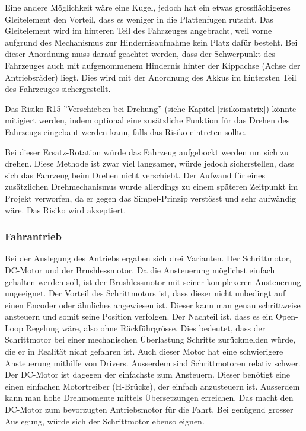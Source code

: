 \documentclass[../main.tex]{subfiles}
\begin{document}
Eine andere Möglichkeit wäre eine Kugel, jedoch hat ein etwas grossflächigeres Gleitelement den Vorteil, dass es weniger in die Plattenfugen rutscht. Das Gleitelement wird im hinteren Teil des Fahrzeuges angebracht, weil vorne aufgrund des Mechanismus zur Hindernisaufnahme kein Platz dafür besteht. Bei dieser Anordnung muss darauf geachtet werden, dass der Schwerpunkt des Fahrzeuges auch mit aufgenommenem Hindernis hinter der Kippachse (Achse der Antriebsräder) liegt. Dies wird mit der Anordnung des Akkus im hintersten Teil des Fahrzeuges sichergestellt.

Das Risiko R15 ''Verschieben bei Drehung'' (siehe Kapitel \ref{risikomatrix}) könnte mitigiert werden,
indem optional eine zusätzliche Funktion für das Drehen des Fahrzeugs eingebaut werden kann, falls das Risiko eintreten sollte.

Bei dieser Ersatz-Rotation würde das Fahrzeug aufgebockt werden um sich zu drehen.
Diese Methode ist zwar viel langsamer, würde jedoch sicherstellen, dass sich das Fahrzeug 
beim Drehen nicht verschiebt. Der Aufwand für eines zusätzlichen Drehmechanismus wurde allerdings zu einem späteren Zeitpunkt im Projekt verworfen, da er gegen das Simpel-Prinzip verstösst und sehr aufwändig wäre. Das Risiko wird akzeptiert.

\subsubsection{Fahrantrieb}
\label{a3:Fahrantrieb}
Bei der Auslegung des Antriebs ergaben sich drei Varianten. Der Schrittmotor, DC-Motor und der Brushlessmotor. Da die Ansteuerung möglichst einfach gehalten werden soll, ist der Brushlessmotor mit seiner komplexeren Ansteuerung ungeeignet. Der Vorteil des Schrittmotors ist, dass dieser nicht unbedingt auf einen Encoder oder ähnliches angewiesen ist. Dieser kann man genau schrittweise ansteuern und somit seine Position verfolgen. Der Nachteil ist, dass es ein Open-Loop Regelung wäre, also ohne Rückführgrösse. Dies bedeutet, dass der Schrittmotor bei einer mechanischen Überlastung Schritte zurückmelden würde, die er in Realität nicht gefahren ist. Auch dieser Motor hat eine schwierigere Ansteuerung mithilfe von Drivers. Ausserdem sind Schrittmotoren relativ schwer. Der DC-Motor ist dagegen der einfachste zum Ansteuern. Dieser benötigt eine einen einfachen Motortreiber (H-Brücke), der einfach anzusteuern ist. Ausserdem kann man hohe Drehmomente mittels Übersetzungen erreichen. Das macht den DC-Motor zum bevorzugten Antriebsmotor für die Fahrt. Bei genügend grosser Auslegung, würde sich der Schrittmotor ebenso eignen. 
\end{document}
